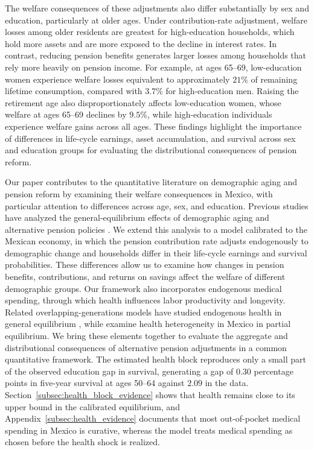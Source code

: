 \documentclass[12pt,a4paper]{article}
\begin{document}
The welfare consequences of these adjustments also differ substantially by sex and education, particularly at older ages. Under contribution-rate adjustment, welfare losses among older residents are greatest for high-education households, which hold more assets and are more exposed to the decline in interest rates. In contrast, reducing pension benefits generates larger losses among households that rely more heavily on pension income. For example, at ages 65--69, low-education women experience welfare losses equivalent to approximately $21\%$ of remaining lifetime consumption, compared with $3.7\%$ for high-education men. Raising the retirement age also disproportionately affects low-education women, whose welfare at ages 65--69 declines by $9.5\%$, while high-education individuals experience welfare gains across all ages. These findings highlight the importance of differences in life-cycle earnings, asset accumulation, and survival across sex and education groups for evaluating the distributional consequences of pension reform.

Our paper contributes to the quantitative literature on demographic aging and pension reform by examining their welfare consequences in Mexico, with particular attention to differences across age, sex, and education. Previous studies have analyzed the general-equilibrium effects of demographic aging and alternative pension policies \citep{KruegerLudwig2007,Kitao2014}. We extend this analysis to a model calibrated to the Mexican economy, in which the pension contribution rate adjusts endogenously to demographic change and households differ in their life-cycle earnings and survival probabilities. These differences allow us to examine how changes in pension benefits, contributions, and returns on savings affect the welfare of different demographic groups. Our framework also incorporates endogenous medical spending, through which health influences labor productivity and longevity. Related overlapping-generations models have studied endogenous health in general equilibrium \citep{JungTranChambers2017}, while \citet{CortesEtAl2024} examine health heterogeneity in Mexico in partial equilibrium. We bring these elements together to evaluate the aggregate and distributional consequences of alternative pension adjustments in a common quantitative framework. The estimated health block reproduces only a small part of the observed education gap in survival, generating a gap of $0.30$ percentage points in five-year survival at ages 50--64 against $2.09$ in the data. Section~\ref{subsec:health_block_evidence} shows that health remains close to its upper bound in the calibrated equilibrium, and Appendix~\ref{subsec:health_evidence} documents that most out-of-pocket medical spending in Mexico is curative, whereas the model treats medical spending as chosen before the health shock is realized.
\end{document}
